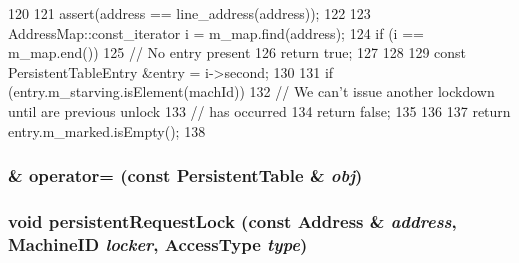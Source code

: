 \begin{DoxyCode}
120 {
121     assert(address == line_address(address));
122 
123     AddressMap::const_iterator i = m_map.find(address);
124     if (i == m_map.end()) {
125         // No entry present
126         return true;
127     }
128 
129     const PersistentTableEntry &entry = i->second;
130 
131     if (entry.m_starving.isElement(machId)) {
132         // We can't issue another lockdown until are previous unlock
133         // has occurred
134         return false;
135     }
136 
137     return entry.m_marked.isEmpty();
138 }
\end{DoxyCode}
\hypertarget{classPersistentTable_af4ed77850998cfdc187ce72c12864dfe}{
\subsubsection[{operator=}]{\& operator= (const {\bf PersistentTable} \& {\em obj})}}
\label{classPersistentTable_af4ed77850998cfdc187ce72c12864dfe}
\hypertarget{classPersistentTable_a628d4613da4e9d953077a69cb0c67e43}{
\subsubsection[{persistentRequestLock}]{\setlength{\rightskip}{0pt plus 5cm}void persistentRequestLock (const {\bf Address} \& {\em address}, \/  {\bf MachineID} {\em locker}, \/  AccessType {\em type})}}
\label{classPersistentTable_a628d4613da4e9d953077a69cb0c67e43}



